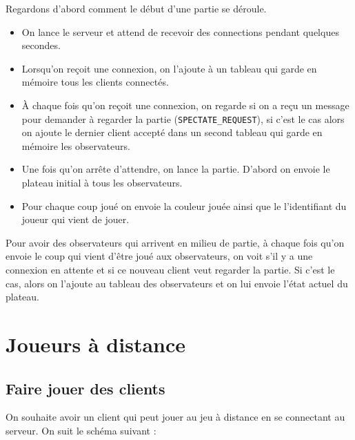 \documentclass[a4paper]{article}
\begin{document}
\noindent Regardons d'abord comment le début d'une partie se déroule.
\begin{itemize}
	\setlength\itemsep{0.5em}
	\item On lance le serveur et attend de recevoir des connections pendant 
	quelques secondes.
	\item Lorsqu'on reçoit une connexion, on l'ajoute à un tableau qui garde en 
	mémoire tous les clients connectés.
	\item À chaque fois qu'on reçoit une connexion, on regarde si on a reçu un 
	message pour demander à regarder la partie (\texttt{SPECTATE\_REQUEST}), si c'est le cas alors on ajoute 
	le dernier client accepté dans un second tableau qui garde en mémoire les 
	observateurs.
	\item Une fois qu'on arrête d'attendre, on lance la partie. D'abord on 
	envoie le plateau initial à tous les observateurs.
	\item Pour chaque coup joué on envoie la couleur jouée ainsi que le 
	l'identifiant du joueur qui vient de jouer. \\
\end{itemize}

\noindent Pour avoir des observateurs qui arrivent en milieu de partie, à chaque fois
qu'on envoie le coup qui vient d'être joué aux observateurs, on voit s'il y a
une connexion en attente et si ce nouveau client veut regarder la partie. Si c'est le cas, alors 
on l'ajoute au tableau des observateurs et on lui envoie l'état actuel du
plateau.



\section{Joueurs à distance}

\subsection{Faire jouer des clients}

On souhaite avoir un client qui peut jouer au jeu à distance en se connectant au serveur. On suit le schéma suivant :
\end{document}
